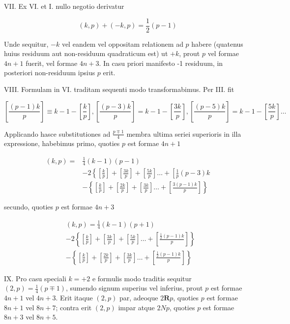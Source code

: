 \documentclass[10pt]{article}
\begin{document}
VII. Ex VI. et I. nullo negotio derivatur

\[
(k, p)+(-k, p)=\frac{1}{2}(p-1)
\]

Unde sequitur, \(-k\) vel eandem vel oppositam relationem ad \(p\) habere (quatenus huius residuum aut non-residuum quadraticum est) ut \(+k\), prout \(p\) vel formae \(4 n+1\) fuerit, vel formae \(4 n+3\). In casu priori manifesto -1 residuum, in posteriori non-residuum ipsius \(p\) erit.

VIII. Formulam in VI. traditam sequenti modo transformabimus. Per III. fit

\[
\left[\frac{(p-1) k}{p}\right] \equiv k-1-\left[\frac{k}{p}\right],\left[\frac{(p-3) k}{p}\right]=k-1-\left[\frac{3 k}{p}\right],\left[\frac{(p-5) k}{p}\right]=k-1-\left[\frac{5 k}{p}\right] \ldots
\]

Applicando hasce substitutiones ad \(\frac{p \mp 1}{4}\) membra ultima seriei superioris in illa expressione, habebimus primo, quoties \(p\) est formae \(4 n+1\)

\[
\begin{aligned}
(k, p)= & \frac{1}{4}(k-1)(p-1) \\
& -2\left\{\left[\frac{k}{p}\right]+\left[\frac{3 k}{p}\right]+\left[\frac{5 k}{p}\right] \ldots+\left[\frac{1}{p}(p-3) k\right.\right. \\
& -\left\{\left[\frac{k}{p}\right]+\left[\frac{2 k}{p}\right]+\left[\frac{3 k}{p}\right] \ldots+\left[\frac{3(p-1) k}{p}\right]\right\}
\end{aligned}
\]

secundo, quoties \(p\) est formae \(4 n+3\)

\[
\begin{aligned}
& (k, p)=\frac{1}{4}(k-1)(p+1) \\
& -2\left\{\left[\frac{k}{p}\right]+\left[\frac{3 k}{p}\right]+\left[\frac{5 k}{p}\right] \ldots+\left[\frac{\frac{1}{2}(p-1) k}{p}\right]\right\} \\
& -\left\{\left[\frac{k}{p}\right]+\left[\frac{2 k}{p}\right]+\left[\frac{3 k}{p}\right] \ldots+\left[\frac{\frac{1}{2}(p-1) k}{p}\right]\right\}
\end{aligned}
\]

IX. Pro casu speciali \(k=+2\) e formulis modo traditis sequitur \((2, p)=\frac{1}{4}(p \mp 1)\), sumendo signum superius vel inferius, prout \(p\) est formae \(4 n+1\) vel \(4 n+3\). Erit itaque \((2, p)\) par, adeoque \(2 \boldsymbol{R} p\), quoties \(p\) est formae \(8 n+1\) vel \(8 n+7\); contra erit \((2, p)\) impar atque \(2 N p\), quoties \(p\) est formae \(8 n+3\) vel \(8 n+5\).
\end{document}
